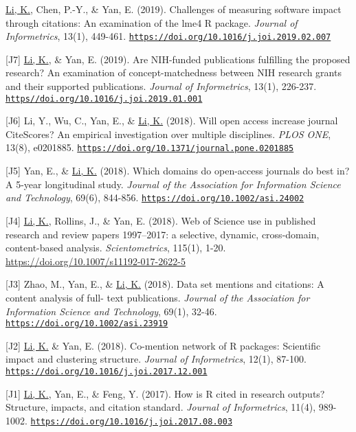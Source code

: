 \documentclass[margin, 10pt]{res} %
\begin{document}
\begin{resume}
[J8] \underline{Li, K.}, Chen, P.-Y., \& Yan, E. (2019). Challenges of measuring software impact through citations: An examination of the lme4 R package. \textit{Journal of Informetrics}, 13(1), 449-461. \href{https://doi.org/10.1016/j.joi.2019.02.007}{\nolinkurl{https://doi.org/10.1016/j.joi.2019.02.007}}

[J7] \underline{Li, K.}, \& Yan, E. (2019). Are NIH-funded publications fulfilling the proposed research? An examination of concept-matchedness between NIH research grants and their supported publications. \textit{Journal of Informetrics}, 13(1), 226-237. \href{https//doi.org/10.1016/j.joi.2019.01.001}{\nolinkurl{https//doi.org/10.1016/j.joi.2019.01.001}}

[J6] Li, Y., Wu, C., Yan, E., \& \underline{Li, K.} (2018). Will open access increase journal CiteScores? An empirical investigation over multiple disciplines. \textit{PLOS ONE}, 13(8), e0201885. \href{https://doi.org/10.1371/journal.pone.0201885}{\nolinkurl{https://doi.org/10.1371/journal.pone.0201885}}

[J5] Yan, E., \& \underline{Li, K.} (2018). Which domains do open-access journals do best in? A 5-year longitudinal study. \textit{Journal of the Association for Information Science and Technology}, 69(6), 844-856. \href{https://doi.org/10.1002/asi.24002}{\nolinkurl{https://doi.org/10.1002/asi.24002}}

[J4] \underline{Li, K.}, Rollins, J., \& Yan, E. (2018). Web of Science use in published research and review papers 1997–2017: a selective, dynamic, cross-domain, content-based analysis. \textit{Scientometrics}, 115(1), 1-20. \href{https://doi.org/10.1007/s11192-017-2622-5}{https://doi.org/10.1007/s11192-017-2622-5}

[J3] Zhao, M., Yan, E., \& \underline{Li, K.} (2018). Data set mentions and citations: A content analysis of full- text publications. \textit{Journal of the Association for Information Science and Technology}, 69(1), 32-46. \href{https://doi.org/10.1002/asi.23919}{\nolinkurl{https://doi.org/10.1002/asi.23919}}

[J2] \underline{Li, K.} \& Yan, E. (2018). Co-mention network of R packages: Scientific impact and clustering structure. \textit{Journal of Informetrics}, 12(1), 87-100. \href{https://doi.org/10.1016/j.joi.2017.12.001}{\nolinkurl{https://doi.org/10.1016/j.joi.2017.12.001}}

[J1] \underline{Li, K.}, Yan, E., \& Feng, Y. (2017). How is R cited in research outputs? Structure, impacts, and citation standard. \textit{Journal of Informetrics}, 11(4), 989-1002. \href{https://doi.org/10.1016/j.joi.2017.08.003}{\nolinkurl{https://doi.org/10.1016/j.joi.2017.08.003}}


\end{resume}
\end{document}
